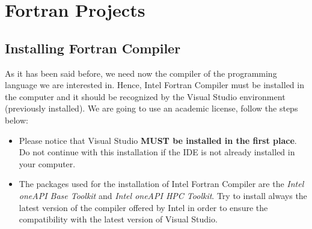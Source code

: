 \chapter{Fortran Projects}


\vspace{0.5cm} 

    \FloatBarrier
    \section{Installing Fortran Compiler} \label{sec:FortranIns}
    
As it has been said before, we need now the compiler of the programming language we are interested in. Hence, Intel\textregistered\hspace{0.05cm} Fortran Compiler must be installed in the computer and it should be recognized by the Visual Studio environment (previously installed). We are going to use an academic license, follow the steps below:


\begin{IN}
    \begin{itemize}
        \item Please notice that Visual Studio \textbf{MUST be installed in the first place}. Do not continue with this installation if the IDE is not already installed in your computer.
        \item The packages used for the installation of Intel\textregistered\hspace{0.05cm} Fortran Compiler are the \textit{Intel\hspace{0.04cm}\textregistered\hspace{0.05cm} oneAPI Base Toolkit} and \textit{Intel\hspace{0.04cm}\textregistered\hspace{0.05cm} oneAPI HPC Toolkit}. Try to install always the latest version of the compiler offered by Intel in order to ensure the compatibility with the latest version of Visual Studio.
    \end{itemize}
\end{IN} 

